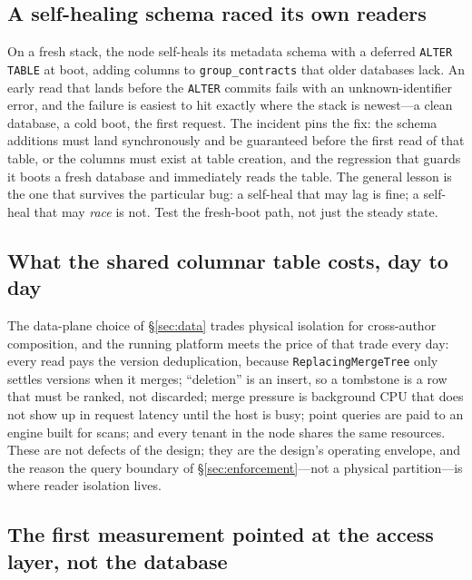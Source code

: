 \documentclass[sigconf, nonacm]{acmart}
\begin{document}
\subsection{A self-healing schema raced its own readers}

On a fresh stack, the node self-heals its metadata schema with a deferred
\texttt{ALTER TABLE} at boot, adding columns to
\texttt{group\_contracts} that older databases lack. An early read that lands
before the \texttt{ALTER} commits fails with an unknown-identifier error, and
the failure is easiest to hit exactly where the stack is newest---a clean
database, a cold boot, the first request. The incident pins the fix: the
schema additions must land synchronously and be guaranteed before the first
read of that table, or the columns must exist at table creation, and the
regression that guards it boots a fresh database and immediately reads the
table. The general lesson is the one that survives the particular bug: a
self-heal that may lag is fine; a self-heal that may \emph{race} is not. Test
the fresh-boot path, not just the steady state.

\subsection{What the shared columnar table costs, day to day}

The data-plane choice of \S\ref{sec:data} trades physical isolation for
cross-author composition, and the running platform meets the price of that
trade every day: every read pays the version deduplication, because
\texttt{ReplacingMergeTree} only settles versions when it merges;
``deletion'' is an insert, so a tombstone is a row that must be ranked, not
discarded; merge pressure is background CPU that does not show up in request
latency until the host is busy; point queries are paid to an engine built
for scans; and every tenant in the node shares the same resources. These are
not defects of the design; they are the design's operating envelope, and the
reason the query boundary of \S\ref{sec:enforcement}---not a physical
partition---is where reader isolation lives.

\subsection{The first measurement pointed at the access layer, not the
database}
\end{document}
